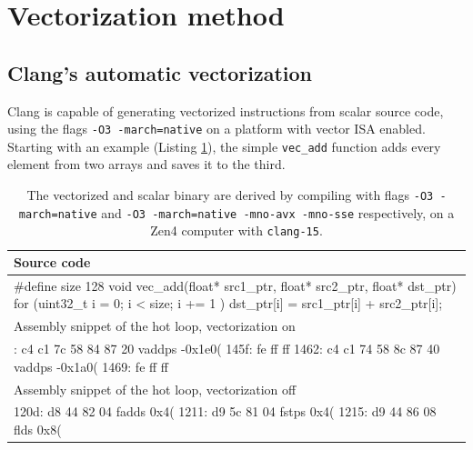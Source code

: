 \documentclass[logo,bsc,singlespacing,parskip]{infthesis}
\newenvironment{VerbatimCompact}
  {\vspace*{-2.5mm}\VerbatimEnvironment
   \par\Verbatim}
  {\endVerbatim\vspace*{-2.4mm}}
\begin{document}
\section{Vectorization method}
\label{sec:vectorization-method}
\subsection{Clang's automatic vectorization}
Clang is capable of generating vectorized instructions from scalar source code,
using the flags \texttt{-O3 -march=native} on a platform with vector ISA
enabled. Starting with an example (Listing \ref{vec-add-float-auto}), the simple
\texttt{vec\_add} function adds every element from two arrays and saves it to
the third. 

\begin{table}[ht]\captionsetup{name=Listing}
\begin{tabular}{>{\raggedright\arraybackslash}p{14cm}}
    Source code\\
    \midrule
    \begin{VerbatimCompact}
#define size 128
void vec_add(float* src1_ptr, float* src2_ptr, float* dst_ptr) {
    for (uint32_t i = 0; i < size; i += 1 ){
        dst_ptr[i] = src1_ptr[i] + src2_ptr[i];
    }
}
    \end{VerbatimCompact}
    \\

    Assembly snippet of the hot loop, vectorization on\\
    \midrule
    \begin{VerbatimCompact}
1458: c4 c1 7c 58 84 87 20   vaddps -0x1e0(%
145f: fe ff ff
1462: c4 c1 74 58 8c 87 40   vaddps -0x1a0(%
1469: fe ff ff
    \end{VerbatimCompact}
    \\
    Assembly snippet of the hot loop, vectorization off\\
    \midrule
    \begin{VerbatimCompact}
120d: d8 44 82 04    fadds  0x4(%
1211: d9 5c 81 04    fstps  0x4(%
1215: d9 44 86 08    flds   0x8(%
    \end{VerbatimCompact}
\end{tabular}
\caption{The vectorized and scalar binary are derived by compiling with flags
\texttt{-O3 -march=native} and \texttt{-O3 -march=native -mno-avx -mno-sse}
respectively, on a Zen4 computer with \texttt{clang-15}.}
\label{vec-add-float-auto}
\end{table}
\end{document}
